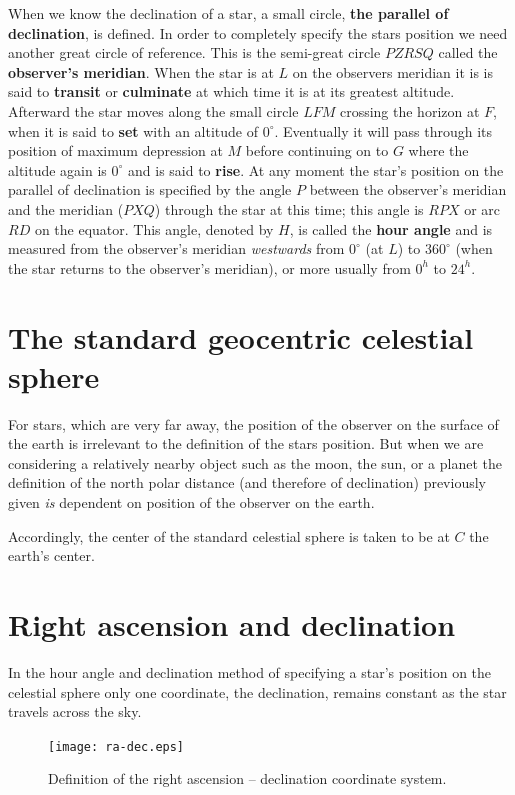 When we know the declination of a star, a small circle, {\bf the
  parallel of declination}, is defined. In order to completely
specify the stars position we need another great circle of
reference. This is the semi-great circle $PZRSQ$ called the {\bf
  observer's meridian}. When the star is at $L$ on the observers
meridian it is is said to {\bf transit} or {\bf culminate} at which
time it is at its greatest altitude. Afterward the star moves along
the small circle $LFM$ crossing the horizon at $F$, when it is said to
{\bf set} with an altitude of $0^\circ$. Eventually it will pass through
its position of maximum depression at $M$ before continuing on to $G$
where the altitude again is $0^\circ$ and is said to {\bf rise}. At
any moment the star's position on the parallel of declination is
specified by the angle $P$ between the observer's meridian and the
meridian ($PXQ$) through the star at this time; this angle is $RPX$ or
arc $RD$ on the equator. This angle, denoted by $H$, is called the
{\bf hour angle} and is measured from the observer's meridian
\textit{westwards} from $0^\circ$ (at $L$) to $360^\circ$ (when the star
returns to the observer's meridian), or more usually from $0^h$ to 
$24^h$. 

\section{The standard geocentric celestial sphere}


For stars, which are very far away, the position of the observer on
the surface of the earth is irrelevant to the definition of the stars
position. But when we are considering a relatively nearby object such
as the moon, the sun, or a planet the definition of the north polar
distance (and therefore of declination) previously given {\it is}
dependent on position of the observer on the earth. 

Accordingly, the center of the standard celestial sphere is taken to
be at $C$ the earth's center. 

\section{Right ascension and declination}

In the hour angle and declination method of specifying a star's
position on the celestial sphere only one coordinate, the declination,
remains constant as the star travels across the sky. 

\begin{figure}[h]
\centering
\texttt{[image: ra-dec.eps]}
\caption{Definition of the right ascension -- declination coordinate system.}
\label{fig:ra-dec}
\end{figure}

